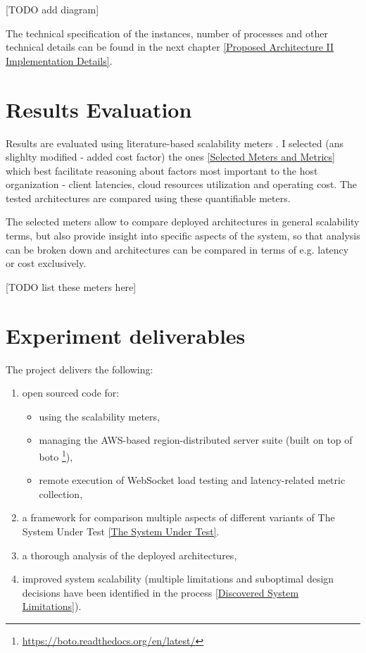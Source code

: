 \documentclass{uvamscse}
\begin{document}
[TODO add diagram]

The technical specification of the instances, number of processes and other technical details can be found in the next chapter \ref{Proposed Architecture II Implementation Details}.

\section{Results Evaluation}
Results are evaluated using literature-based scalability meters \cite{Models}. I selected (ans slighlty modified - added cost factor) the ones \ref{Selected Meters and Metrics} which best facilitate reasoning about factors most important to the host organization - client latencies, cloud resources utilization and operating cost. The tested architectures are compared using these quantifiable meters.

The selected meters allow to compare deployed architectures in general scalability terms, but also provide insight into specific aspects of the system, so that analysis can be broken down and architectures can be compared in terms of e.g. latency or cost exclusively.

[TODO list these meters here]

\section{Experiment deliverables}\label{Experiment deliverables}

The project delivers the following:
\begin{enumerate}
  \item open sourced code for:
  \begin{itemize}
    \item using the scalability meters,
    \item managing the AWS-based region-distributed server suite (built on top of boto \footnote{\url{https://boto.readthedocs.org/en/latest/}}),
    \item remote execution of WebSocket load testing and latency-related metric collection,
  \end{itemize}
  \item a framework for comparison multiple aspects of different variants of The System Under Test \ref{The System Under Test}.
  \item a thorough analysis of the deployed architectures,
  \item improved system scalability (multiple limitations and suboptimal design decisions have been identified in the process \ref{Discovered System Limitations}).
\end{enumerate}
\end{document}
